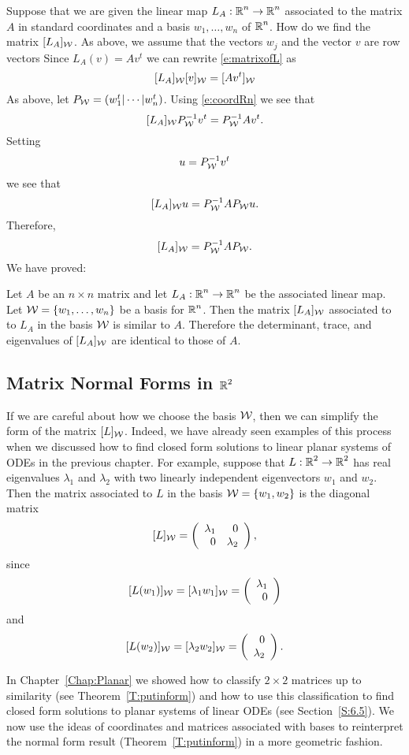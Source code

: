 \documentclass{ximera}
\begin{document}
Suppose that we are given the linear map $L_A:\mbox{$\Bbb{R}$}^n\to\mbox{$\Bbb{R}$}^n$ associated to
the matrix $A$ in standard coordinates and a basis $w_1,\ldots,w_n$ of $\mbox{$\Bbb{R}$}^n$.
How do we find the matrix $[L_A]_{\cal W}$. As above, we assume that the
vectors $w_j$ and the vector $v$ are row vectors  Since $L_A(v)=Av^t$ we can
rewrite \eqref{e:matrixofL} as
\[
[L_A]_{\cal W}[v]_{\cal W} = [Av^t]_{\cal W}
\]
As above, let $P_{\cal W}=(w_1^t|\cdots|w_n^t)$.  Using \eqref{e:coordRn} we
see that
\[
[L_A]_{\cal W}P_{\cal W}^{-1} v^t = P_{\cal W}^{-1} Av^t.
\]
Setting
\[
u= P_{\cal W}^{-1} v^t
\]
we see that
\[
[L_A]_{\cal W}u = P_{\cal W}^{-1} A P_{\cal W}u.
\]
Therefore,
\[
[L_A]_{\cal W} = P_{\cal W}^{-1} AP_{\cal W}.
\]
We have proved:
\begin{theorem}
Let $A$ be an $n\times n$ matrix and let $L_A:\mbox{$\Bbb{R}$}^n\to\mbox{$\Bbb{R}$}^n$ be the associated
linear map.  Let ${\cal W} = \{w_1,\ldots,w_n\}$ be a basis for
$\mbox{$\Bbb{R}$}^n$.  Then the matrix $[L_A]_{\cal W}$ associated to to $L_A$ in the basis
${\cal W}$ is similar to $A$.  Therefore the determinant, trace,
and eigenvalues of $[L_A]_{\cal W}$ are identical to those of $A$.
\end{theorem}




\subsection*{Matrix Normal Forms in $\mbox{$\Bbb{R}$}^2$} 

If we are careful about how we choose the basis ${\cal W}$, then
we can simplify the form of the matrix $[L]_{\cal W}$.  Indeed, we
have already seen examples of this process when we discussed how
to find closed form solutions to linear planar systems of ODEs in
the previous chapter.  For example, suppose that $L:\mbox{$\Bbb{R}$}^2\to\mbox{$\Bbb{R}$}^2$
has real eigenvalues $\lambda_1$ and $\lambda_2$ with two
linearly independent eigenvectors $w_1$ and $w_2$.  Then the
matrix associated to $L$ in the basis ${\cal W} = \{w_1,w_2\}$
is the diagonal matrix
\begin{equation}   \label{e:diagcoord}
[L]_{\cal W} = \left(\begin{array}{rr} \lambda_1 & 0\\ 0 &\lambda_2\end{array}\right),
\end{equation}
since
\[
[L(w_1)]_{\cal W}  =  [\lambda_1w_1]_{\cal W} = \left(\begin{array}{r} \lambda_1 \\ 0\end{array}\right) 
\]
and
\[
[L(w_2)]_{\cal W}  = [\lambda_2w_2]_{\cal W} =  \left(\begin{array}{r} 0 \\ \lambda_2\end{array}\right).
\]

In Chapter~\ref{Chap:Planar} we showed how to classify $2\times 2$
matrices up to similarity (see 
Theorem~\ref{T:putinform}) and how to use this classification to find
closed form solutions to planar systems of linear ODEs (see
Section~\ref{S:6.5}).  We now use
the ideas of coordinates and matrices associated with bases to
reinterpret the normal form result (Theorem~\ref{T:putinform}) in a more geometric fashion.
\end{document}
